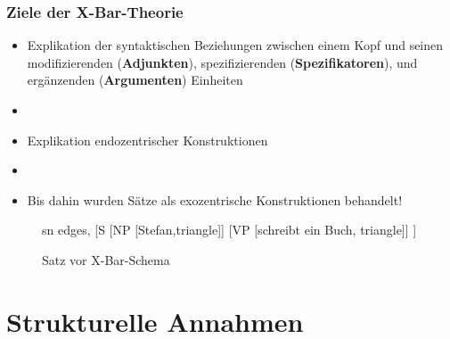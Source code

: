 \begin{frame}
\frametitle{Ziele der X-Bar-Theorie}

\begin{itemize}
	\item Explikation der syntaktischen Beziehungen zwischen einem Kopf und seinen modifizierenden (\textbf{Adjunkten}), spezifizierenden (\textbf{Spezifikatoren}), und ergänzenden (\textbf{Argumenten}) Einheiten
	\item[]
	\item Explikation endozentrischer Konstruktionen
	\item[]
	\item Bis dahin wurden Sätze als exozentrische Konstruktionen behandelt!
\end{itemize}

\begin{figure}[b]
	\begin{minipage}[b]{0.05\textwidth}
	\end{minipage} 
	\begin{minipage}[b]{0.50\textwidth}
	\centering
	\footnotesize{
		\begin{forest}
		sn edges,
		[S	[NP [Stefan,triangle]]
			[VP [schreibt ein Buch, triangle]]
		]
		\end{forest}
		}
		\caption{Satz vor X-Bar-Schema}	
  	\end{minipage}  
	\begin{minipage}[b]{0.05\textwidth}
  	\end{minipage}
  	
\end{figure}

\end{frame}


\section{Strukturelle Annahmen}

